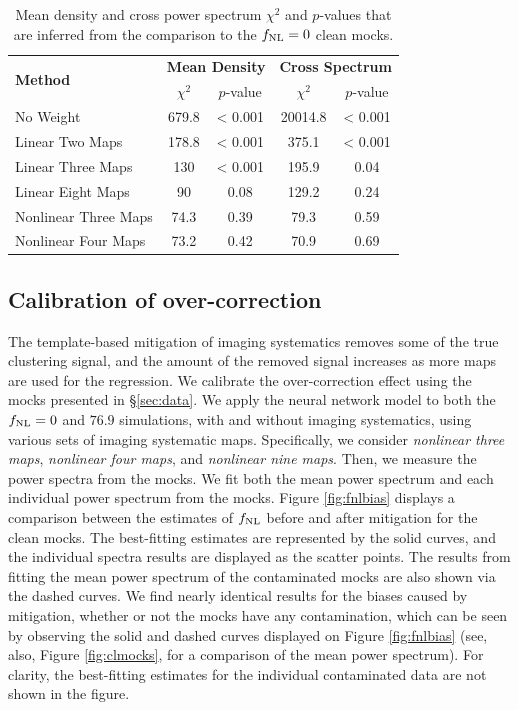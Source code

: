 \begin{table}
  \caption{Mean density and cross power spectrum $\chi^{2}$ and $p$-values that are inferred from the comparison to the $f_{\rm NL}=0$ clean mocks.}\label{tab:chi2test}
  \begin{tabular}{lcccc}
    \hline
    \hline
    \multirow{2}{*}{\textbf{Method}} &
      \multicolumn{2}{c}{\textbf{Mean Density}} &
      \multicolumn{2}{c}{\textbf{Cross Spectrum}} \\
    & $\chi^{2}$ & $p$-value & $\chi^{2}$ & $p$-value \\
    \hline
   No Weight & 679.8 & < 0.001 & 20014.8 & < 0.001 \\
   Linear Two Maps & 178.8 & < 0.001 & 375.1 & < 0.001\\
   Linear Three Maps & 130 & < 0.001 & 195.9 & 0.04\\
   Linear Eight Maps & 90 & 0.08 & 129.2 & 0.24\\
   Nonlinear Three Maps & 74.3 & 0.39  & 79.3 & 0.59\\
   Nonlinear Four Maps & 73.2 & 0.42 & 70.9 & 0.69\\    
    \hline
  \end{tabular}
\end{table}


\subsection{Calibration of over-correction}\label{ssec:calibration}

The template-based mitigation of imaging systematics removes some of the true clustering signal, and the amount of the removed signal increases as more maps are used for the regression. We calibrate the over-correction effect using the mocks presented in \S \ref{sec:data}. We apply the neural network model to both the $f_{\rm NL}=0$ and $76.9$ simulations, with and without imaging systematics, using various sets of imaging systematic maps. Specifically, we consider \textit{nonlinear three maps}, \textit{nonlinear four maps}, and \textit{nonlinear nine maps}. Then, we measure the power spectra from the mocks. We fit both the mean power spectrum and each individual power spectrum from the mocks. Figure \ref{fig:fnlbias} displays a comparison between the estimates of $f_{\rm NL}$ before and after mitigation for the clean mocks. The best-fitting estimates are represented by the solid curves, and the individual spectra results are displayed as the scatter points. The results from fitting the mean power spectrum of the contaminated mocks are also shown via the dashed curves. We find nearly identical results for the biases caused by mitigation, whether or not the mocks have any contamination, which can be seen by observing the solid and dashed curves displayed on Figure \ref{fig:fnlbias} (see, also, Figure \ref{fig:clmocks}, for a comparison of the mean power spectrum). For clarity, the best-fitting estimates for the individual contaminated data are not shown in the figure.

